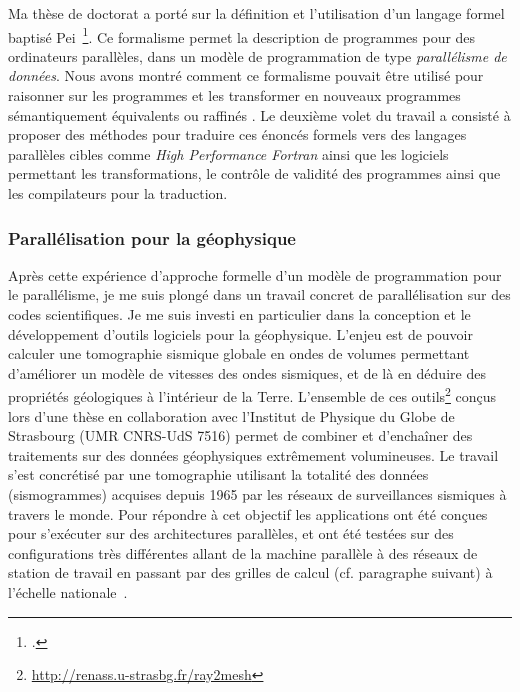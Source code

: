 \documentclass[11pt]{article}
\begin{document}
Ma  thèse  de   doctorat  \cite{icps-1997-4}  a  porté  sur   la  définition  et
l'utilisation  d'un   langage  formel  baptis\'e   Pei~\footcite{Violard92}.  Ce
formalisme permet la description de  programmes pour des ordinateurs parallèles,
dans un  modèle de  programmation de type  \emph{parallélisme de  données}. Nous
avons montré comment  ce formalisme pouvait être utilisé pour  raisonner sur les
programmes et les transformer  en nouveaux programmes sémantiquement équivalents
ou    raffinés   \cite{icps-1994-46,icps-1995-1,icps-1997-3,icps-1996-2}.     Le
deuxième volet du  travail a consisté à proposer des  méthodes pour traduire ces
énoncés  formels   vers  des  langages  parallèles   cibles  comme  \textit{High
  Performance Fortran}  ainsi que les logiciels  permettant les transformations,
le  contrôle de  validité  des programmes  ainsi que  les  compilateurs pour  la
traduction.%


\subsubsection{Parallélisation pour la géophysique}

Après cette expérience d'approche formelle  d'un modèle de programmation pour le
parallélisme, je me  suis plongé dans un travail concret  de parallélisation sur
des codes scientifiques. Je me suis investi en particulier dans la conception et
le développement d'outils logiciels pour  la géophysique. L'enjeu est de pouvoir
calculer  une  tomographie  sismique  globale en  ondes  de  volumes  permettant
d'améliorer un modèle de  vitesses des ondes sismiques, et de  là en déduire des
propriétés  géologiques   à  l'intérieur   de  la   Terre.  L'ensemble   de  ces
outils\footnote{\url{http://renass.u-strasbg.fr/ray2mesh}}  conçus   lors  d'une
thèse en collaboration  avec l'Institut de Physique du Globe  de Strasbourg (UMR
CNRS-UdS 7516) permet de combiner et d'enchaîner des traitements sur des données
géophysiques  extrêmement  volumineuses. Le  travail  s'est  concrétisé par  une
tomographie  utilisant la  totalité des  données (sismogrammes)  acquises depuis
1965  par les  réseaux  de  surveillances sismiques  à  travers  le monde.  Pour
répondre à cet objectif les applications ont été conçues pour s'exécuter sur des
architectures  parallèles,  et  ont  été testées  sur  des  configurations  très
différentes allant de  la machine parallèle à des réseaux  de station de travail
en  passant par  des  grilles de  calcul (cf.  paragraphe  suivant) à  l'échelle
nationale~\cite{icps-2005-146,icps-2007-184}.
\end{document}
